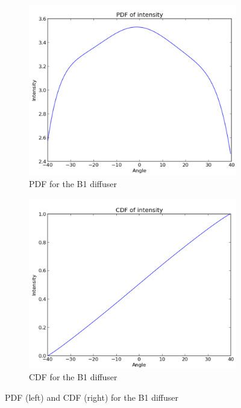 \begin{figure}
    \centering
    
    \begin{subfigure}{0.5\textwidth}
        \centering
        \includegraphics[width=\textwidth]{Figures/B1_diff_pdf.png} %
        \caption{PDF for the B1 diffuser}
    \end{subfigure}\hfill
    \begin{subfigure}{0.5\textwidth}
        \centering
        \includegraphics[width=\textwidth]{Figures/B1_diff_cdf.PNG} %
        \caption{CDF for the B1 diffuser}
    \end{subfigure}
    \caption{PDF (left) and CDF (right) for the B1 diffuser}
    \label{fig:PDF_CDF_diff_B1}
\end{figure}


